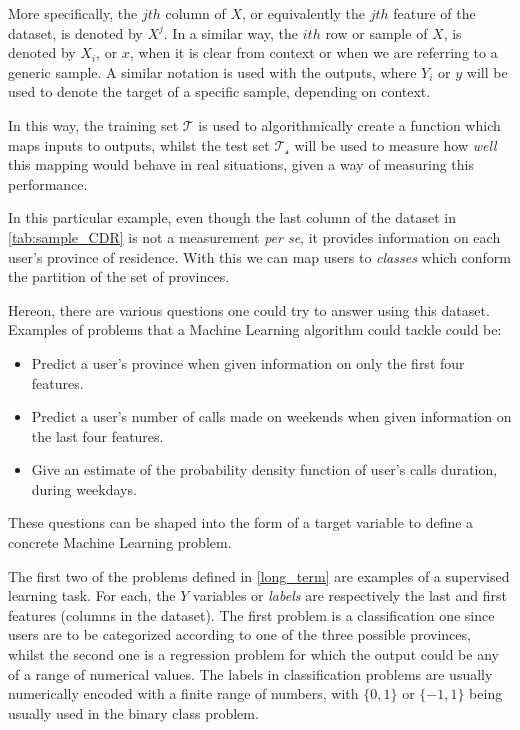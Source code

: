 More specifically, the $jth$ column of $X$, or equivalently the $jth$ feature of the dataset, is denoted by $X^j$.
In a similar way, the $ith$ row or sample of $X$, is denoted by $X_i$, or $x$, when it is clear from context or when we are referring to a generic sample.
A similar notation is used with the outputs, where $Y_i$ or $y$ will be used to denote the target of a specific sample, depending on context.

In this way, the training set $\mathcal{T}$ is used to algorithmically create a function which maps inputs to outputs,  whilst the test set $\mathcal{T_s}$ will be used to measure how \textit{well} this mapping would behave in real situations, given a way of measuring this performance.

In this particular example, even though the last column of the dataset in \cref{tab:sample_CDR} is not a measurement \textit{per se}, it provides information on each user's province of residence.
With this we can map users to \textit{classes} which conform the partition of the set of provinces.

Hereon, there are various questions one could try to answer using this dataset.
Examples of problems that a Machine Learning algorithm could tackle could be:
\begin{itemize}
\item Predict a user's province when given information on only the first four features.
\item Predict a user's number of calls made on weekends when given information on the last four features.
\item Give an estimate of the probability density function of user's calls duration, during weekdays.
\end{itemize}

These questions can be shaped into the form of a target variable to define a concrete Machine Learning problem.

The first two of the problems defined in \cref{long_term} are examples of a supervised learning task.
For each, the $Y$ variables or \textit{labels} are respectively the last and first features (columns in the dataset).
The first problem is a classification one since users are to be categorized according to one of the three possible provinces, whilst the second one is a regression problem for which the output could be any of a range of numerical values.
The labels in classification problems are usually numerically encoded with a finite range of numbers, with $\{0,1\}$ or $\{-1,1\}$ being usually used in the binary class problem.

